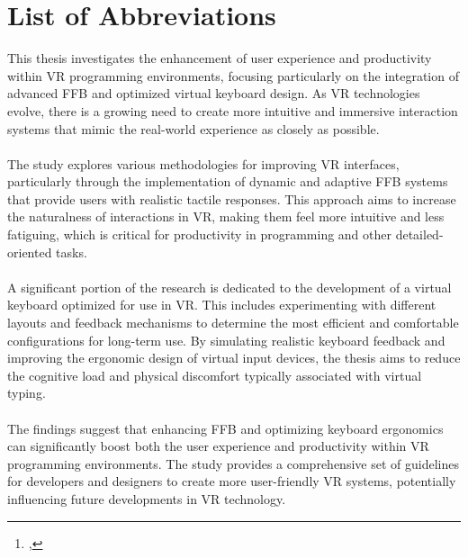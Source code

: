 \documentclass[12pt,toc=bib,toc=listof]{scrreprt}
\title{\reprttopic}
\author{\reprtstudentname\footnote{\reprtstudentid, \reprtstudentmail}}
\begin{document}
\maketitle
{}

\tableofcontents
\chapter*{List of Abbreviations}
\printacronyms[heading=none, display=all]

\label{sec:listofabbrv}

\listoffigures
\listoftables

\onehalfspacing

\label{cha:management_summary}

This thesis investigates the enhancement of user experience and productivity within \ac{VR} programming environments, focusing particularly on the integration of advanced \ac{FFB} and optimized virtual keyboard design. As \ac{VR} technologies evolve, there is a growing need to create more intuitive and immersive interaction systems that mimic the real-world experience as closely as possible.\\ \\
The study explores various methodologies for improving \ac{VR} interfaces, particularly through the implementation of dynamic and adaptive \ac{FFB} systems that provide users with realistic tactile responses. This approach aims to increase the naturalness of interactions in \ac{VR}, making them feel more intuitive and less fatiguing, which is critical for productivity in programming and other detailed-oriented tasks.\\ \\
A significant portion of the research is dedicated to the development of a virtual keyboard optimized for use in \ac{VR}. This includes experimenting with different layouts and feedback mechanisms to determine the most efficient and comfortable configurations for long-term use. By simulating realistic keyboard feedback and improving the ergonomic design of virtual input devices, the thesis aims to reduce the cognitive load and physical discomfort typically associated with virtual typing.\\ \\
The findings suggest that enhancing \ac{FFB} and optimizing keyboard ergonomics can significantly boost both the user experience and productivity within \ac{VR} programming environments. The study provides a comprehensive set of guidelines for developers and designers to create more user-friendly \ac{VR} systems, potentially influencing future developments in \ac{VR} technology.
\end{document}
